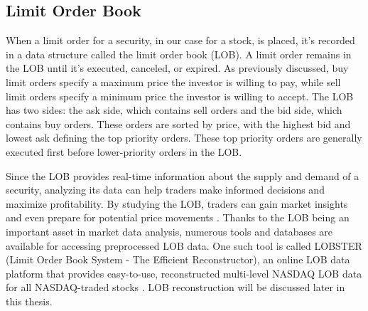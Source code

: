 \documentclass[a4paper,oneside,onecolumn,12pt]{book}
\begin{document}
	\subsection{Limit Order Book}
	When a limit order for a security, in our case for a stock, is placed, it's recorded in a data structure called the limit order book (LOB). A limit order remains in the LOB until it's executed, canceled, or expired. As previously discussed, buy limit orders specify a maximum price the investor is willing to pay, while sell limit orders specify a minimum price the investor is willing to accept. The LOB has two sides: the ask side, which contains sell orders and the bid side, which contains buy orders. These orders are sorted by price, with the highest bid and lowest ask defining the top priority orders. These top priority orders are generally executed first before lower-priority orders in the LOB. \cite{WLOBDD}

	Since the LOB provides real-time information about the supply and demand of a security, analyzing its data can help traders make informed decisions and maximize profitability. By studying the LOB, traders can gain market insights and even prepare for potential price movements \cite{PIMPILOB}. Thanks to the LOB being an important asset in market data analysis, numerous tools and databases are available for accessing preprocessed LOB data. One such tool is called LOBSTER (Limit Order Book System - The Efficient Reconstructor), an online LOB data platform that provides easy-to-use, reconstructed multi-level NASDAQ LOB data for all NASDAQ-traded stocks \cite{WLOBSTER}. LOB reconstruction will be discussed later in this thesis.
\end{document}

